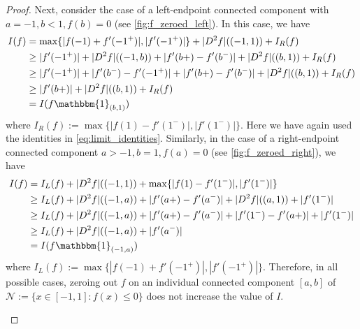 \documentclass{article}
\def\cN{{\mathcal{N}}}
\begin{document}
\begin{appendices}
\begin{proof}
   Next, consider the case of a left-endpoint connected component with $a = -1, b < 1, f(b) = 0$ (see \cref{fig:f_zeroed_left}). In this case, we have
    \begin{align}
        I(f) &= \max\{ |f(-1)+f'(-1^{+})|, |f'(-1^{+})| \} + |D^2 f|((-1,1)) + I_R(f) \\
        &\geq |f'(-1^{+})| + |D^2 f|((-1,b)) + |f'(b+) - f'(b^{-})| + |D^2 f|((b,1)) + I_R(f) \\
        &\geq |f'(-1^{+})| + |f'(b^{-}) - f'(-1^{+})| + |f'(b+) - f'(b^{-})| + |D^2 f|((b,1)) + I_R(f) \\
        &\geq |f'(b+)| + |D^2 f|((b,1)) + I_R(f) \\
        &= I(f \mathbbm{1}_{(b,1)})
    \end{align}
    where $I_R(f) := \max\{ |f(1)-f'(1^{-})|, |f'(1^{-})| \} $. Here we have again used the identities in \eqref{eq:limit_identities}. Similarly, in the case of a right-endpoint connected component $a > -1, b = 1, f(a) = 0$ (see \cref{fig:f_zeroed_right}), we have
    \begin{align}
        I(f) &=   I_L(f) + |D^2f|((-1,1)) + \max\{ |f(1)-f'(1^{-})|, |f'(1^{-})| \} \\
        &\geq I_L(f) + |D^2 f|((-1,a)) + |f'(a+) - f'(a^{-})| + |D^2 f|((a,1)) + |f'(1^{-})| \\
        &\geq I_L(f) + |D^2 f|((-1,a)) + |f'(a+) - f'(a^{-})| + |f'(1^{-}) - f'(a+)| + |f'(1^{-})| \\
        &\geq I_L(f) + |D^2 f|((-1,a)) + |f'(a^{-})| \\
        &= I(f \mathbbm{1}_{(-1,a)})
    \end{align}
    where $I_L(f) := \max\{ |f(-1)+f'(-1^{+})|, |f'(-1^{+})| \}$. Therefore, in all possible cases, zeroing out $f$ on an individual connected component $[a,b]$ of $\cN := \{ x \in [-1,1]: f(x) \leq 0 \}$ does not increase the value of $I$.

    \begin{figure}
        \centering
    

\end{figure}
\end{proof}
\end{appendices}
\end{document}
